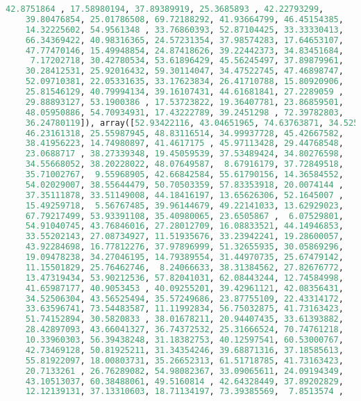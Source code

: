\documentclass{article}
\begin{document}
\begin{lstlisting}[language=Python,basicstyle=\ttfamily]
    42.8751864 , 17.58980194, 37.89389919, 25.3685893 , 42.22793299,
    39.80476854, 25.01786508, 69.72188292, 41.93664799, 46.45154385,
    14.32225602, 54.9561348 , 33.76860393, 52.87104425, 33.33330413,
    66.34369422, 40.98316365, 24.57231354, 37.98574283, 17.64653107,
    47.77470146, 15.49948854, 24.87418626, 39.22442373, 34.83451684,
     7.17202718, 30.42780534, 53.61896429, 45.56245497, 37.89879961,
    30.28412531, 25.92016432, 59.30114047, 34.47522745, 47.46898747,
    52.09710381, 22.05331635, 33.17623834, 26.41710788, 15.80920906,
    25.81546129, 40.79994134, 39.16107431, 44.61681841, 27.2289059 ,
    29.88893127, 53.1900386 , 17.53723822, 19.36407781, 23.86859501,
    48.05950886, 54.70934931, 17.43222789, 39.2451298 , 72.39782803,
    36.24780119]), array([52.93422116, 43.04651965, 74.63763871, 34.52506304, 11.22807931,
    46.23161318, 25.55987945, 48.83116514, 34.99937728, 45.42667582,
    38.41956223, 14.74980897, 41.4617175 , 45.97113428, 29.44768548,
    23.0688717 , 38.27339348, 19.45059539, 37.53489424, 34.80276598,
    34.55668052, 38.20228022, 48.07649587,  8.67916179, 37.72849518,
    35.71002767,  9.55968905, 42.66842584, 55.61790156, 14.36584552,
    54.02029007, 38.55644479, 50.70503359, 57.83353918, 20.0074144 ,
    37.35111878, 33.51149008, 44.18416197, 13.65626306, 52.1645007 ,
    15.49259718,  5.56767485, 39.96144679, 49.22141033, 13.62929023,
    67.79217499, 53.93391108, 35.40980065, 23.6505867 ,  6.07529801,
    54.91040745, 43.76846016, 27.28012709, 16.08833521, 44.14946853,
    33.55202143, 27.08734927, 11.51935676, 33.23942241, 19.28600057,
    43.92284698, 16.77812276, 37.97896999, 51.32655935, 30.05869296,
    19.09478238, 34.27046195, 14.79389554, 31.44970735, 25.67479142,
    11.15501829, 25.76462746,  8.24066633, 38.31384562, 27.82676772,
    13.47319434, 53.90212536, 57.82041031, 62.08443244, 12.74584998,
    41.65987177, 40.9053453 , 40.09255201, 39.42961121, 42.08356431,
    34.52506304, 43.56525494, 35.57249686, 23.87755109, 22.43314172,
    33.63596741, 73.54483587, 11.11992834, 56.75032875, 41.73163423,
    51.74152894, 30.5820833 , 38.01678211, 20.94407435, 33.61393882,
    28.42897093, 43.66041327, 36.74372532, 25.31666524, 70.74761218,
    10.33960303, 56.39438248, 31.18382753, 40.12597541, 60.53000767,
    42.73469128, 50.81925211, 31.34354246, 39.68871316, 37.18585613,
    55.81922097, 18.00803731, 35.26652313, 61.51718785, 41.73163423,
    20.7133261 , 26.76289082, 54.98082367, 33.09065611, 24.09194349,
    43.10513037, 60.38488061, 49.5160814 , 42.64328449, 37.89202829,
    12.12139131, 37.13310603, 18.71134197, 73.39385569,  7.8513574 ,

\end{lstlisting}
\end{document}
